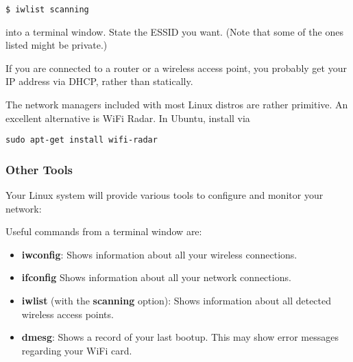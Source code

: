 \documentclass[11pt]{article}
\begin{document}
\begin{Verbatim}[fontsize=\relsize{-2}]
$ iwlist scanning
\end{Verbatim}

into a terminal window.  State the ESSID you want.  (Note that some of
the ones listed might be private.)

If you are connected to a router or a wireless access point, you
probably get your IP address via DHCP, rather than statically.

The network managers included with most Linux distros are rather
primitive.  An excellent alternative is WiFi Radar.  In Ubuntu, install
via

\begin{Verbatim}[fontsize=\relsize{-2}]
sudo apt-get install wifi-radar
\end{Verbatim}

\subsubsection{Other Tools}

Your Linux system will provide various tools to configure and monitor
your network:

Useful commands from a terminal window are:

\begin{itemize}

\item {\bf iwconfig}:  
Shows information about all your wireless connections.

\item {\bf ifconfig}
Shows information about all your network connections.

\item {\bf iwlist} (with the {\bf scanning} option):
Shows information about all detected wireless access points.

\item {\bf dmesg}:
Shows a record of your last bootup.  This may show error messages
regarding your WiFi card.

\end{itemize}

% 

\end{document}
